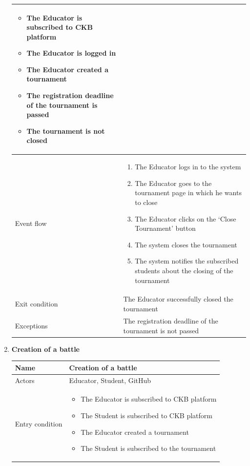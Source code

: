 \begin{enumerate}[label=UC\arabic*:]
\begin{tabular}{|p{3cm}|p{8cm}|}
\begin{itemize}
        \item The Educator is subscribed to CKB platform
        \item The Educator is logged in 
        \item The Educator created a tournament
        \item The registration deadline of the tournament is passed
        \item The tournament is not closed
    \end{itemize}
    \\
    \hline
    Event flow &
    \begin{enumerate}[label=\arabic*.]
        \item The Educator logs in to the system
        \item The Educator goes to the tournament page in which he wants to close
        \item The Educator clicks on the `Close Tournament' button
        \item The system closes the tournament
        \item The system notifies the subscribed students about the closing of the tournament
    \end{enumerate}
    \\
    \hline
    Exit condition & The Educator successfully closed the tournament \\
    \hline
    Exceptions & The registration deadline of the tournament is not passed \\
    \hline
    \end{tabular}
    \item \textbf{Creation of a battle} \\
    \begin{tabular}{|p{3cm}|p{8cm}|}
        \hline
        Name & Creation of a battle \\
        \hline
        Actors & Educator, Student, GitHub \\
        \hline
        Entry condition &
        \begin{itemize}
            \item The Educator is subscribed to CKB platform
            \item The Student is subscribed to CKB platform
            \item The Educator created a tournament
            \item The Student is subscribed to the tournament
        \end{itemize}
        \\

\end{tabular}
\end{enumerate}
